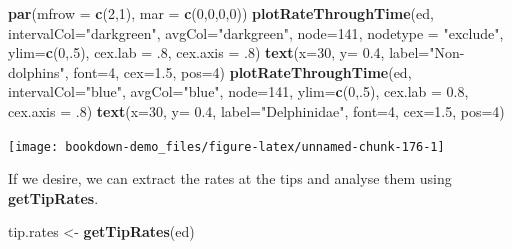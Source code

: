 \documentclass[
]{book}
\newenvironment{Shaded}{\begin{snugshade}}{\end{snugshade}}
\newcommand{\DataTypeTok}[1]{\textcolor[rgb]{0.13,0.29,0.53}{#1}}
\newcommand{\DecValTok}[1]{\textcolor[rgb]{0.00,0.00,0.81}{#1}}
\newcommand{\FloatTok}[1]{\textcolor[rgb]{0.00,0.00,0.81}{#1}}
\newcommand{\KeywordTok}[1]{\textcolor[rgb]{0.13,0.29,0.53}{\textbf{#1}}}
\newcommand{\NormalTok}[1]{#1}
\newcommand{\StringTok}[1]{\textcolor[rgb]{0.31,0.60,0.02}{#1}}
\begin{document}
\begin{Shaded}
\begin{Highlighting}[]
\KeywordTok{par}\NormalTok{(}\DataTypeTok{mfrow =} \KeywordTok{c}\NormalTok{(}\DecValTok{2}\NormalTok{,}\DecValTok{1}\NormalTok{), }\DataTypeTok{mar =} \KeywordTok{c}\NormalTok{(}\DecValTok{0}\NormalTok{,}\DecValTok{0}\NormalTok{,}\DecValTok{0}\NormalTok{,}\DecValTok{0}\NormalTok{))}
\KeywordTok{plotRateThroughTime}\NormalTok{(ed, }\DataTypeTok{intervalCol=}\StringTok{"darkgreen"}\NormalTok{, }\DataTypeTok{avgCol=}\StringTok{"darkgreen"}\NormalTok{, }\DataTypeTok{node=}\DecValTok{141}\NormalTok{, }\DataTypeTok{nodetype =} \StringTok{"exclude"}\NormalTok{, }\DataTypeTok{ylim=}\KeywordTok{c}\NormalTok{(}\DecValTok{0}\NormalTok{,.}\DecValTok{5}\NormalTok{), }\DataTypeTok{cex.lab =} \FloatTok{.8}\NormalTok{, }\DataTypeTok{cex.axis =} \FloatTok{.8}\NormalTok{)}
\KeywordTok{text}\NormalTok{(}\DataTypeTok{x=}\DecValTok{30}\NormalTok{, }\DataTypeTok{y=} \FloatTok{0.4}\NormalTok{, }\DataTypeTok{label=}\StringTok{"Non{-}dolphins"}\NormalTok{, }\DataTypeTok{font=}\DecValTok{4}\NormalTok{, }\DataTypeTok{cex=}\FloatTok{1.5}\NormalTok{, }\DataTypeTok{pos=}\DecValTok{4}\NormalTok{)}
\KeywordTok{plotRateThroughTime}\NormalTok{(ed, }\DataTypeTok{intervalCol=}\StringTok{"blue"}\NormalTok{, }\DataTypeTok{avgCol=}\StringTok{"blue"}\NormalTok{, }\DataTypeTok{node=}\DecValTok{141}\NormalTok{, }\DataTypeTok{ylim=}\KeywordTok{c}\NormalTok{(}\DecValTok{0}\NormalTok{,.}\DecValTok{5}\NormalTok{), }\DataTypeTok{cex.lab =} \FloatTok{0.8}\NormalTok{, }\DataTypeTok{cex.axis =} \FloatTok{.8}\NormalTok{)}
\KeywordTok{text}\NormalTok{(}\DataTypeTok{x=}\DecValTok{30}\NormalTok{, }\DataTypeTok{y=} \FloatTok{0.4}\NormalTok{, }\DataTypeTok{label=}\StringTok{"Delphinidae"}\NormalTok{, }\DataTypeTok{font=}\DecValTok{4}\NormalTok{, }\DataTypeTok{cex=}\FloatTok{1.5}\NormalTok{, }\DataTypeTok{pos=}\DecValTok{4}\NormalTok{)}
\end{Highlighting}
\end{Shaded}

\begin{center}\texttt{[image: bookdown-demo\_files/figure-latex/unnamed-chunk-176-1]} \end{center}

If we desire, we can extract the rates at the tips and analyse them using \textbf{getTipRates}.

\begin{Shaded}
\begin{Highlighting}[]
\NormalTok{tip.rates \textless{}{-}}\StringTok{ }\KeywordTok{getTipRates}\NormalTok{(ed)}
\end{Highlighting}
\end{Shaded}
\end{document}
